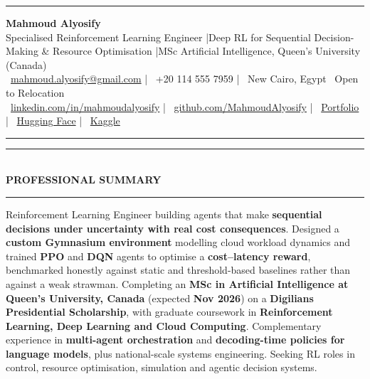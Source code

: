 \documentclass[10pt, a4paper]{article}
\newcommand{\faEnvelope}{}\newcommand{\faPhone}{}\newcommand{\faMapMarker}{}%
\newcommand{\faLinkedin}{}\newcommand{\faGithub}{}\newcommand{\faRobot}{}%
\newcommand{\faChartBar}{}\newcommand{\faGlobe}{}%
\newcommand{\cvsection}[1]{%
  \vspace{3pt}%
  {\color{navy}\rule{\linewidth}{1.1pt}}\\[0.5pt]%
  {\color{navy}\bfseries\fontsize{9.5}{11}\selectfont\uppercase{#1}}\\[-4pt]%
  {\color{teal}\rule{\linewidth}{0.6pt}}%
  \vspace{2pt}%
}
\begin{document}
\small

{\color{navy}\rule{\linewidth}{1.5pt}}

\vspace{3pt}
\begin{center}
  {\fontsize{21}{24}\bfseries\color{navy} Mahmoud Alyosify}\\[3pt]
  {\fontsize{10}{12}\color{teal}
    Specialised Reinforcement Learning Engineer \enspace|\enspace Deep RL for Sequential Decision-Making \& Resource Optimisation
    \enspace|\enspace MSc Artificial Intelligence, Queen's University (Canada)
}\\[4pt]
  {\color{midgray}
    \faEnvelope\ \href{mailto:mahmoud.alyosify@gmail.com}{mahmoud.alyosify@gmail.com}
    \enspace|\enspace
    \faPhone\ +20 114 555 7959
    \enspace|\enspace
    \faMapMarker\ New Cairo, Egypt \textperiodcentered\ Open to Relocation}\\[2pt]
  {\faLinkedin\ \href{https://linkedin.com/in/mahmoudalyosify}{linkedin.com/in/mahmoudalyosify}
    \enspace|\enspace
    \faGithub\ \href{https://github.com/MahmoudAlyosify}{github.com/MahmoudAlyosify}
    \enspace|\enspace
    \faGlobe\ \href{https://mahmoudalyosifysite.github.io/}{Portfolio}
    \enspace|\enspace
    \faRobot\ \href{https://huggingface.co/mahmoudalyosify}{Hugging Face}
    \enspace|\enspace
    \faChartBar\ \href{https://kaggle.com/mahmoudalyosify}{Kaggle}}
\end{center}

{\color{navy}\rule{\linewidth}{1.5pt}}

\vspace{2pt}

\cvsection{Professional Summary}

{\color{darkgray}\justifying
Reinforcement Learning Engineer building agents that make \textbf{sequential decisions under uncertainty with real cost consequences}. Designed a \textbf{custom Gymnasium environment} modelling cloud workload dynamics and trained \textbf{PPO} and \textbf{DQN} agents to optimise a \textbf{cost--latency reward}, benchmarked honestly against static and threshold-based baselines rather than against a weak strawman. Completing an \textbf{MSc in Artificial Intelligence at Queen's University, Canada} (expected \textbf{Nov 2026}) on a \textbf{Digilians Presidential Scholarship}, with graduate coursework in \textbf{Reinforcement Learning, Deep Learning and Cloud Computing}. Complementary experience in \textbf{multi-agent orchestration} and \textbf{decoding-time policies for language models}, plus national-scale systems engineering. Seeking RL roles in control, resource optimisation, simulation and agentic decision systems.}
\end{document}
